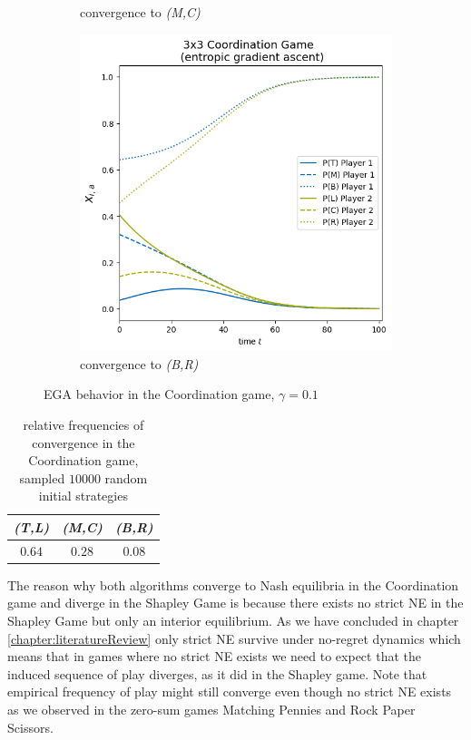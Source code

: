 \begin{figure}[H]
\begin{subfigure}{.5\textwidth}
    \caption{convergence to \textit{(M,C)}}
    \label{fig:Coordination3x3b}
\end{subfigure}
\begin{subfigure}{.5\textwidth}
    \centering
    \includegraphics[width=\textwidth]{logos/Coordination3x3-3.png}
    \caption{convergence to \textit{(B,R)}}
    \label{fig:Coordination3x3c}
\end{subfigure}%
\caption{EGA behavior in the Coordination game, $\gamma = 0.1$}
\label{fig:Coordination3x3}
\end{figure}

\begin{table}
\centering
\captionsetup{justification=centering}
 \begin{tabular}{||c c c||} 
 \hline
 \textit{(T,L)} & \textit{(M,C)} & \textit{(B,R)} \\ [0.5ex] 
 \hline\hline
 $0.64$ & $0.28$ & $0.08$ \\ [1ex] 
 \hline
 \end{tabular}\caption{\label{tab:frequencies}relative frequencies of convergence in the Coordination game, \\ sampled $10000$ random initial strategies}
\end{table}

The reason why both algorithms converge to Nash equilibria in the Coordination game and diverge in the Shapley Game is because there exists no strict NE in the Shapley Game but only an interior equilibrium. As we have concluded in chapter \ref{chapter:literatureReview} only strict NE survive under no-regret dynamics which means that in games where no strict NE exists we need to expect that the induced sequence of play diverges, as it did in the Shapley game. Note that empirical frequency of play might still converge even though no strict NE exists as we observed in the zero-sum games Matching Pennies and Rock Paper Scissors. 


